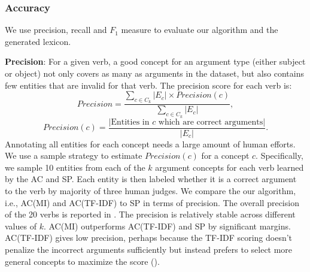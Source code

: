 \subsubsection{Accuracy}
We use precision, recall and $F_1$ measure to evaluate our
algorithm and the generated lexicon.

\textbf{Precision}:
For a given verb, a good concept for an argument type
(either subject or object) not only covers as many as arguments in the dataset,
but also contains few entities that are invalid for that verb.
The precision score for each verb is:
\[
Precision = \frac{\sum_{c \in C_k}|E_c|\times Precision(c)}
{\sum_{c \in C_k}{|E_c|}},
\]
\[
Precision(c)=\frac{|\mbox{Entities in~} c
\mbox{~which are correct arguments}|}{|E_c|}.
\]
Annotating all entities for each concept needs a large
amount of human efforts. We use a sample strategy to
estimate $Precision(c)$ for a concept $c$. Specifically,
we sample 10 entities from each of the $k$ argument concepts
for each verb learned by the AC and SP.
Each entity is then labeled whether it is a correct argument to the
verb by majority of three human judges.
We compare the our algorithm, i.e., AC(MI) and AC(TF-IDF) to
SP in terms of precision.
The overall precision of the 20 verbs
is reported in .
The precision is relatively
stable across different values of $k$.
AC(MI) outperforms AC(TF-IDF) and
SP by significant margins. AC(TF-IDF) gives low precision,
perhaps because the TF-IDF scoring doesn't penalize the incorrect arguments
sufficiently but instead prefers to select more general
concepts to maximize the score ().

